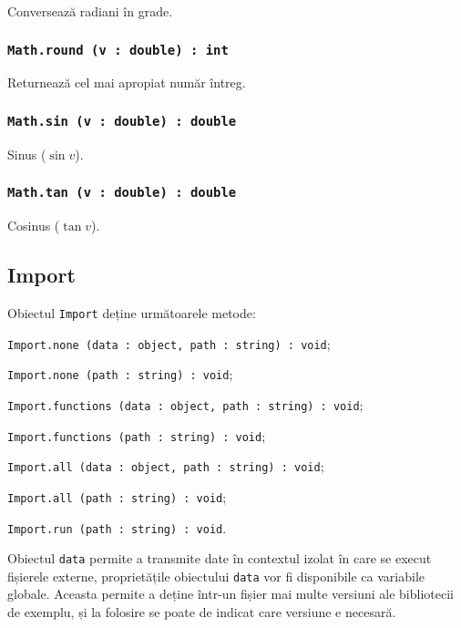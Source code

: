 Conversează radiani în grade.

\subsubsection{\texttt{Math.round (v : double) : int}}

Returnează cel mai apropiat număr întreg.

\subsubsection{\texttt{Math.sin (v : double) : double}}

Sinus ($\sin{v}$).

\subsubsection{\texttt{Math.tan (v : double) : double}}

Cosinus ($\tan{v}$).

\subsection{{\color{orange} Import}}

Obiectul \texttt{Import} deține următoarele metode:
\begin{icItems}
	\item \texttt{Import.none (data : object, path : string) : void};
	\item \texttt{Import.none (path : string) : void};
	\item \texttt{Import.functions (data : object, path : string) : void};
	\item \texttt{Import.functions (path : string) : void};
	\item \texttt{Import.all (data : object, path : string) : void};
	\item \texttt{Import.all (path : string) : void};
	\item \texttt{Import.run (path : string) : void}.
\end{icItems}

Obiectul \texttt{data} permite a transmite date în contextul izolat în care se execut fișierele externe, proprietățile obiectului \texttt{data} vor fi disponibile ca variabile globale. Aceasta permite a deține într-un fișier mai multe versiuni ale bibliotecii de exemplu, și la folosire se poate de indicat care versiune e necesară.

